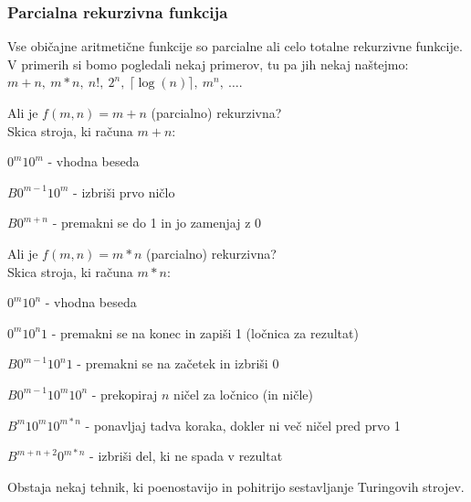 \documentclass[10pt,a4paper,oneside]{book}
\begin{document}
\subsubsection{Parcialna rekurzivna funkcija}
Vse običajne aritmetične funkcije so parcialne ali celo totalne rekurzivne funkcije. V primerih si bomo pogledali nekaj primerov, tu pa jih nekaj naštejmo: $m+n,\ m*n,\ n!,\ 2^n,\ \lceil \log(n) \rceil,\ m^n,\ \dots$.
\begin{primeri}
\item
    Ali je $f(m,n)=m+n$ (parcialno) rekurzivna?\\
    Skica stroja, ki računa $m+n$:
    \begin{items}
    \item $0^m 1 0^m$ - vhodna beseda
    \item $B0^{m-1} 1 0^m$ - izbriši prvo ničlo
    \item $B0^{m+n}$ - premakni se do 1 in jo zamenjaj z 0
    \end{items}%
\item
    Ali je $f(m,n)=m*n$ (parcialno) rekurzivna?\\
    Skica stroja, ki računa $m*n$:
    \begin{items}
    \item $0^m 1 0^n$ - vhodna beseda
    \item $0^m 1 0^n 1$ - premakni se na konec in zapiši 1 (ločnica za rezultat)
    \item $B 0^{m-1} 1 0^n 1$ - premakni se na začetek in izbriši 0
    \item $B 0^{m-1} 1 0^m 1 0^n$ - prekopiraj $n$ ničel za ločnico (in ničle)
    \item $B^{m} 1 0^m 1 0^{m*n}$ - ponavljaj tadva koraka, dokler ni več ničel pred prvo 1
    \item $B^{m+n+2}0^{m*n}$ - izbriši del, ki ne spada v rezultat 
    \end{items}%
\end{primeri}

Obstaja nekaj tehnik, ki poenostavijo in pohitrijo sestavljanje Turingovih strojev.%
\end{document}

